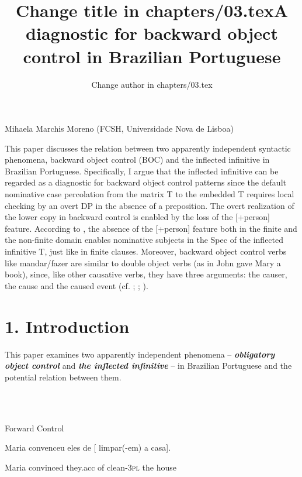 \documentclass[output=paper]{langsci/langscibook}
\author{Change author in chapters/03.tex}
\title{Change title in chapters/03.tex}
\begin{document}
\title{A diagnostic for backward object control in Brazilian Portuguese}

 

Mihaela Marchis Moreno (FCSH, Universidade Nova de Lisboa)

\begin{stylelsAbstract}
This paper discusses the relation between two apparently independent syntactic phenomena, backward object control (BOC) and the inflected infinitive in Brazilian Portuguese. Specifically, I argue that the inflected infinitive can be regarded as a diagnostic for backward object control patterns since the default nominative case percolation from the matrix T to the embedded T requires local checking by an overt DP in the absence of a preposition. The overt realization of the lower copy in backward control is enabled by the loss of the [+person] feature. According to \citet{Cyrino2010}, the absence of the [+person] feature both in the finite and the non-finite domain enables nominative subjects in the Spec of the inflected infinitive T, just like in finite clauses. Moreover, backward object control verbs like mandar/fazer are similar to double object verbs (as in John gave Mary a book), since, like other causative verbs, they have three arguments: the causer, the cause and the caused event (cf. \citealt{Zubizarreta1985}; \citealt{Alsina1992}; \citealt{Ippolito2000}).
\end{stylelsAbstract}

\section{ 1. Introduction}

This paper examines two apparently independent phenomena – \textbf{\textit{obligatory object control}} and \textbf{\textit{the inflected infinitive} }– in Brazilian Portuguese and the potential relation between them.

\ea%
    \label{ex:key:1}
    \gll\\
        \\
    \glt
    \z

           Forward Control

Maria convenceu eles  de  [  limpar(-em)   a     casa].     

Maria   convinced   they.acc of       clean-\textsc{3pl}  the house

\ea%
    \label{ex:key:2}
    \gll\\
        \\
    \glt
    \z
\end{document}
